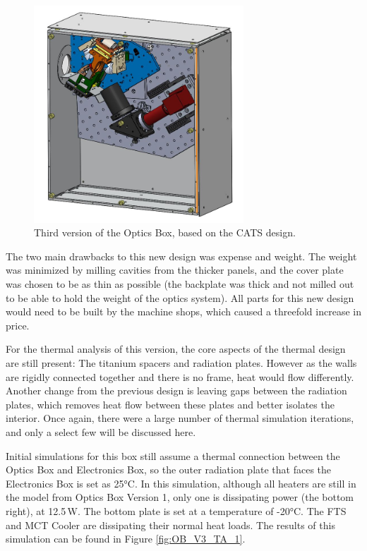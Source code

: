 \begin{figure}
    \centering
    \includegraphics[width=0.7\textwidth]{chap3_images/LIFE_V3_images/Optics_Box_V2.JPG}
    \caption{Third version of the Optics Box, based on the CATS design.}
    \label{fig:OB_V3}
\end{figure}

The two main drawbacks to this new design was expense and weight. The weight was minimized by milling cavities from the thicker panels, and the cover plate was chosen to be as thin as possible (the backplate was thick and not milled out to be able to hold the weight of the optics system). All parts for this new design would need to be built by the machine shops, which caused a threefold increase in price. 

For the thermal analysis of this version, the core aspects of the thermal design are still present: The titanium spacers and radiation plates. However as the walls are rigidly connected together and there is no frame, heat would flow differently. Another change from the previous design is leaving gaps between the radiation plates, which removes heat flow between these plates and  better isolates the interior. Once again, there were a large number of thermal simulation iterations, and only a select few will be discussed here.

Initial simulations for this box still assume a thermal connection between the Optics Box and Electronics Box, so the outer radiation plate that faces the Electronics Box is set as 25°C. In this simulation, although all heaters are still in the model from Optics Box Version 1, only one is dissipating power (the bottom right), at 12.5\,W. The bottom plate is set at a temperature of -20°C. The FTS and MCT Cooler are dissipating their normal heat loads. The results of this simulation can be found in Figure \ref{fig:OB_V3_TA_1}.

